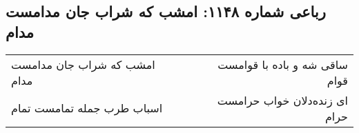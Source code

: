 \begin{center}
\section*{رباعی شماره ۱۱۴۸: امشب که شراب جان مدامست مدام}
\label{sec:1148}
\begin{longtable}{l p{0.5cm} r}
امشب که شراب جان مدامست مدام
&&
ساقی شه و باده با قوامست قوام
\\
اسباب طرب جمله تمامست تمام
&&
ای زنده‌دلان خواب حرامست حرام
\\
\end{longtable}
\end{center}
